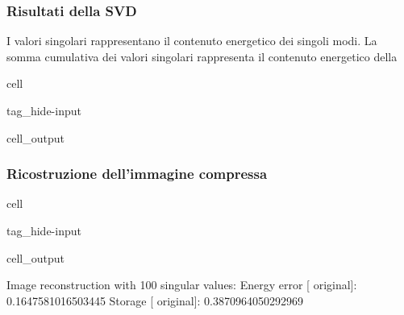 \documentclass[letterpaper,10pt,italian]{jupyterBook}
\begin{document}
\subsubsection{Risultati della SVD}
\label{\detokenize{ch/ai/pca:risultati-della-svd}}
\sphinxAtStartPar
I valori singolari rappresentano il contenuto energetico dei singoli modi. La somma cumulativa dei valori singolari rappresenta il contenuto energetico della

\begin{sphinxuseclass}{cell}
\begin{sphinxuseclass}{tag_hide-input}\begin{sphinxVerbatimOutput}

\begin{sphinxuseclass}{cell_output}
\noindent{}

\end{sphinxuseclass}\end{sphinxVerbatimOutput}

\end{sphinxuseclass}
\end{sphinxuseclass}

\subsubsection{Ricostruzione dell’immagine compressa}
\label{\detokenize{ch/ai/pca:ricostruzione-dell-immagine-compressa}}
\begin{sphinxuseclass}{cell}
\begin{sphinxuseclass}{tag_hide-input}\begin{sphinxVerbatimOutput}

\begin{sphinxuseclass}{cell_output}
\begin{sphinxVerbatim}[commandchars=\\\{\}]
Image reconstruction with 100 singular values:
\PYGZgt{} Energy error [\PYGZpc{} original]: 0.1647581016503445
\PYGZgt{} Storage      [\PYGZpc{} original]: 0.3870964050292969
\end{sphinxVerbatim}

\noindent{}

\end{sphinxuseclass}\end{sphinxVerbatimOutput}

\end{sphinxuseclass}
\end{sphinxuseclass}
\sphinxstepscope
\end{document}
